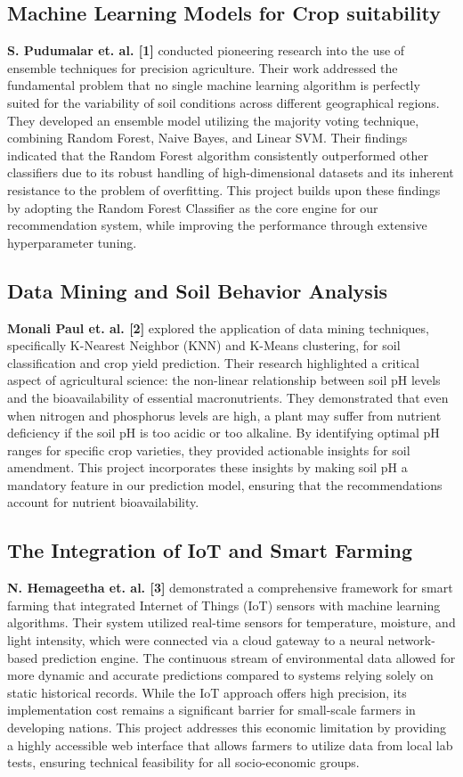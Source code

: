 \documentclass[12pt,a4paper]{report}
\begin{document}
\subsection{Machine Learning Models for Crop suitability}
\textbf{S. Pudumalar et. al. [1]} conducted pioneering research into the use of ensemble techniques for precision agriculture. Their work addressed the fundamental problem that no single machine learning algorithm is perfectly suited for the variability of soil conditions across different geographical regions. They developed an ensemble model utilizing the majority voting technique, combining Random Forest, Naive Bayes, and Linear SVM. Their findings indicated that the Random Forest algorithm consistently outperformed other classifiers due to its robust handling of high-dimensional datasets and its inherent resistance to the problem of overfitting. This project builds upon these findings by adopting the Random Forest Classifier as the core engine for our recommendation system, while improving the performance through extensive hyperparameter tuning.

\subsection{Data Mining and Soil Behavior Analysis}
\textbf{Monali Paul et. al. [2]} explored the application of data mining techniques, specifically K-Nearest Neighbor (KNN) and K-Means clustering, for soil classification and crop yield prediction. Their research highlighted a critical aspect of agricultural science: the non-linear relationship between soil pH levels and the bioavailability of essential macronutrients. They demonstrated that even when nitrogen and phosphorus levels are high, a plant may suffer from nutrient deficiency if the soil pH is too acidic or too alkaline. By identifying optimal pH ranges for specific crop varieties, they provided actionable insights for soil amendment. This project incorporates these insights by making soil pH a mandatory feature in our prediction model, ensuring that the recommendations account for nutrient bioavailability.

\subsection{The Integration of IoT and Smart Farming}
\textbf{N. Hemageetha et. al. [3]} demonstrated a comprehensive framework for smart farming that integrated Internet of Things (IoT) sensors with machine learning algorithms. Their system utilized real-time sensors for temperature, moisture, and light intensity, which were connected via a cloud gateway to a neural network-based prediction engine. The continuous stream of environmental data allowed for more dynamic and accurate predictions compared to systems relying solely on static historical records. While the IoT approach offers high precision, its implementation cost remains a significant barrier for small-scale farmers in developing nations. This project addresses this economic limitation by providing a highly accessible web interface that allows farmers to utilize data from local lab tests, ensuring technical feasibility for all socio-economic groups.
\end{document}
